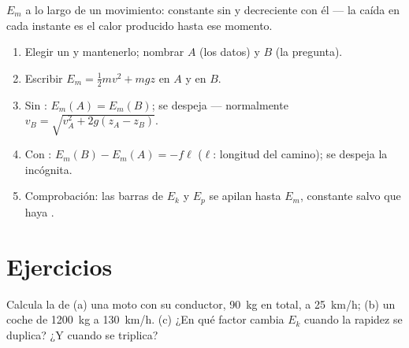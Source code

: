 \begin{omfigure}

{\small $E_m$ a lo largo de un movimiento: constante sin  y
decreciente con él --- la caída en cada instante es el calor producido
hasta ese momento.}
\end{omfigure}

\begin{method}\label{met:g11:mechanical-energy:bookkeeping}
\begin{enumerate}
  \item Elegir un  y mantenerlo; nombrar $A$ (los
        datos) y $B$ (la pregunta).
  \item Escribir $E_m = \tfrac12 mv^2 + mgz$ en $A$ y en $B$.
  \item Sin : $E_m(A) = E_m(B)$; se despeja --- normalmente
        $v_B = \sqrt{v_A^2 + 2g(z_A - z_B)}$.
  \item Con : $E_m(B) - E_m(A) = -f\ell$ ($\ell$: longitud del
        camino); se despeja la incógnita.
  \item Comprobación: las barras de $E_k$ y $E_p$ se apilan hasta $E_m$,
        constante salvo que haya .
\end{enumerate}
\end{method}

\section{Ejercicios}

\begin{exercise}[$\star$]\label{exo:g11:mechanical-energy:1}
Calcula la  de (a) una moto con su conductor,
\qty{90}{kg} en total, a \qty{25}{km/h}; (b) un coche de \qty{1200}{kg}
a \qty{130}{km/h}. (c) ¿En qué factor cambia $E_k$ cuando la rapidez se
duplica? ¿Y cuando se triplica?
\end{exercise}

